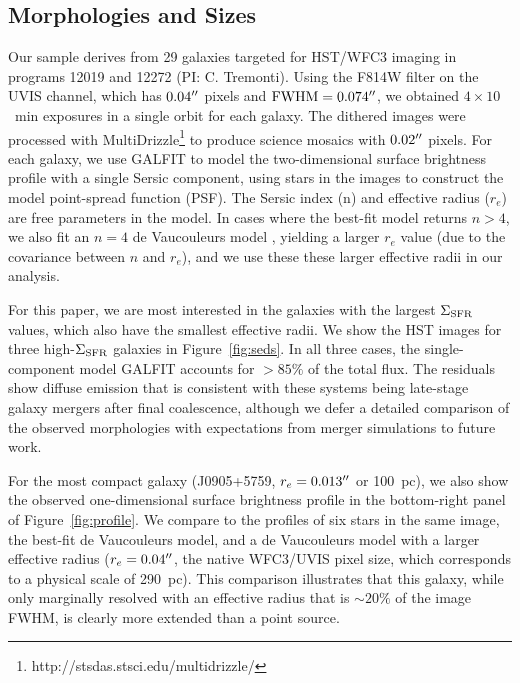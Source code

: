 \documentclass[apj]{emulateapj}
\newcommand{\sigmasfr}{\Sigma_{\textnormal{\scriptsize{SFR}}}}
\begin{document}
\subsection{Morphologies and Sizes}

Our sample derives from 29 galaxies targeted for HST/WFC3 imaging in
programs 12019 and 12272 (PI: C. Tremonti).  Using the F814W filter on
the UVIS channel, which has $0.04\mbox{$^{\prime\prime}$}$ pixels and
$\textnormal{FWHM}=0.074\mbox{$^{\prime\prime}$}$, we obtained $4\times10$~min
exposures in a single orbit for each galaxy.  The dithered images were
processed with
MultiDrizzle\footnote{http://stsdas.stsci.edu/multidrizzle/} to
produce science mosaics with $0.02\mbox{$^{\prime\prime}$}$ pixels.  For each galaxy,
we use GALFIT \citep{pen02,pen10} to model the two-dimensional surface
brightness profile with a single Sersic component, using stars in the
images to construct the model point-spread function (PSF).  The Sersic
index (n) and effective radius ($r_e$) are free parameters in the
model.  In cases where the best-fit model returns $n>4$, we also fit
an $n=4$ de Vaucouleurs model \citep{dev48}, yielding a larger $r_e$
value (due to the covariance between $n$ and $r_e$), and we use these
these larger effective radii in our analysis.

For this paper, we are most interested in the galaxies with the
largest $\sigmasfr$ values, which also have the smallest effective
radii.  We show the HST images for three high-$\sigmasfr$ galaxies in
Figure~\ref{fig:seds}.  In all three cases, the single-component model
GALFIT accounts for $>85\%$ of the total flux.  The residuals show
diffuse emission that is consistent with these systems being
late-stage galaxy mergers after final coalescence, although we defer a
detailed comparison of the observed morphologies with expectations
from merger simulations to future work.

For the most compact galaxy (J0905+5759, $r_e=0.013\mbox{$^{\prime\prime}$}$ or
100~pc), we also show the observed one-dimensional surface brightness
profile in the bottom-right panel of Figure~\ref{fig:profile}.  We
compare to the profiles of six stars in the same image, the best-fit
de Vaucouleurs model, and a de Vaucouleurs model with a larger
effective radius ($r_e=0.04\mbox{$^{\prime\prime}$}$, the native WFC3/UVIS pixel size,
which corresponds to a physical scale of 290~pc).  This comparison
illustrates that this galaxy, while only marginally resolved with an
effective radius that is $\sim20\%$ of the image FWHM, is clearly more
extended than a point source.
\end{document}
